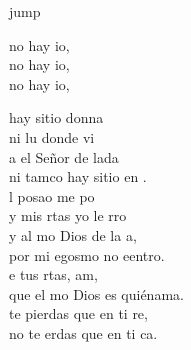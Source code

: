 \begin{cancion}jump\\
	\begin{chorus}%
		 no hay io,  \\
		no hay io,  \\
		no hay io,  \jump\\
	\end{chorus}%
	hay sitio donna \\
	ni lu donde vi \\
	a el Señor de lada\\
	ni tamco hay sitio en .\\
	\jump
	l posao me po\\
	y mis rtas yo le rro\\
	y al mo Dios de la a,\\
	por mi egosmo no eentro.\\
	\jump
	e tus rtas, am,\\
	que el mo Dios es quiénama.\\
	te pierdas que en ti re,\\
	no te erdas que en ti ca.\\
\end{cancion}%
